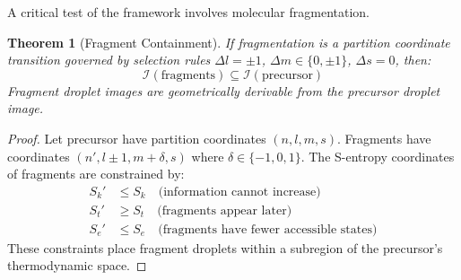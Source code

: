 \documentclass[twocolumn,10pt,a4paper]{article}
\newtheorem{theorem}{Theorem}[section]
\theoremstyle{definition}
\theoremstyle{remark}
\newcommand{\Sk}{S_k}
\newcommand{\St}{S_t}
\newcommand{\Se}{S_e}
\begin{document}
A critical test of the framework involves molecular fragmentation.

\begin{theorem}[Fragment Containment]
\label{thm:fragment_containment}
If fragmentation is a partition coordinate transition governed by selection rules $\Delta l = \pm 1$, $\Delta m \in \{0, \pm 1\}$, $\Delta s = 0$, then:
\begin{equation}
    \mathcal{I}(\text{fragments}) \subseteq \mathcal{I}(\text{precursor})
\end{equation}
Fragment droplet images are geometrically derivable from the precursor droplet image.
\end{theorem}

\begin{proof}
Let precursor have partition coordinates $(n, l, m, s)$. Fragments have coordinates $(n', l \pm 1, m + \delta, s)$ where $\delta \in \{-1, 0, 1\}$. The S-entropy coordinates of fragments are constrained by:
\begin{align}
    \Sk' &\leq \Sk \quad \text{(information cannot increase)} \\
    \St' &\geq \St \quad \text{(fragments appear later)} \\
    \Se' &\leq \Se \quad \text{(fragments have fewer accessible states)}
\end{align}
These constraints place fragment droplets within a subregion of the precursor's thermodynamic space.
\end{proof}
\end{document}
